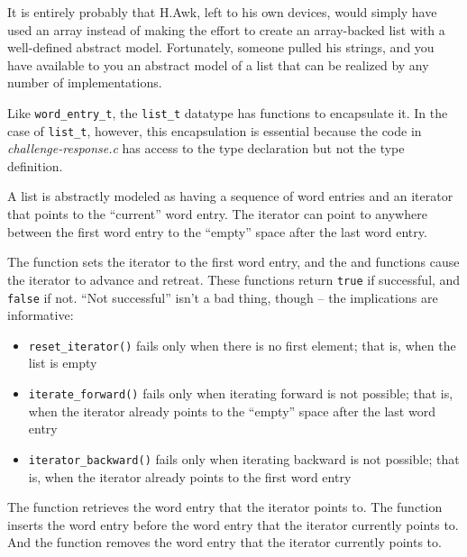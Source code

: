 It is entirely probably that H.Awk, left to his own devices, would simply have used an array instead of making the effort to create an array-backed list with a well-defined abstract model.
Fortunately, someone pulled his strings, and you have available to you an abstract model of a list that can be realized by any number of implementations.

Like \lstinline{word_entry_t}, the \lstinline{list_t} datatype has functions to encapsulate it.
In the case of \lstinline{list_t}, however, this encapsulation is essential because the code in \textit{challenge-response.c} has access to the type declaration but not the type definition.

\begin{description}
\end{description}

A list is abstractly modeled as having a sequence of word entries and an iterator that points to the ``current'' word entry.
The iterator can point to anywhere between the first word entry to the ``empty'' space after the last word entry.

The  function sets the iterator to the first word entry, and the  and  functions cause the iterator to advance and retreat.
These functions return \lstinline{true} if successful, and \lstinline{false} if not.
``Not successful'' isn't a bad thing, though -- the implications are informative:
\begin{itemize}
    \item \lstinline{reset_iterator()} fails only when there is no first element; that is, when the list is empty
    \item \lstinline{iterate_forward()} fails only when iterating forward is not possible; that is, when the iterator already points to the ``empty'' space after the last word entry
    \item \lstinline{iterator_backward()} fails only when iterating backward is not possible; that is, when the iterator already points to the first word entry
\end{itemize}

The  function retrieves the word entry that the iterator points to.
The  function inserts the word entry before the word entry that the iterator currently points to.
And the  function removes the word entry that the iterator currently points to.

